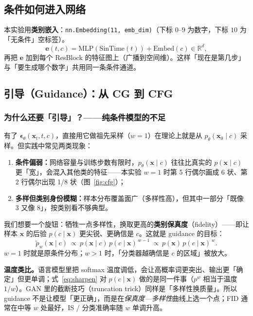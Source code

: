 \documentclass[a4paper,fontset=none,zihao=5]{ctexart}
\newcommand{\x}{\mathbf{x}}
\newcommand{\epst}{\boldsymbol{\epsilon}_\theta}
\newcommand{\code}[1]{\texttt{#1}}
\begin{document}
\subsection{条件如何进入网络}
本实验用\textbf{类别嵌入}：\code{nn.Embedding(11, emb\_dim)}（下标 $0$–$9$ 为数字，下标 $10$ 为「无条件」空标签）。
\begin{equation}
  \mathbf e(t,c)=\mathrm{MLP}(\mathrm{SinTime}(t))+\mathrm{Embed}(c)\in\mathbb R^{d},
\end{equation}
再把 $\mathbf e$ 加到每个 ResBlock 的特征图上（广播到空间维）。这样「现在是第几步」与「要生成哪个数字」共用同一条条件通道。

\subsection{引导（Guidance）：从 CG 到 CFG}

\subsubsection{为什么还要「引导」？——纯条件模型的不足}
有了 $\epst(\x_t,t,c)$，直接用它做祖先采样（$w=1$）在理论上就是从 $p_\theta(\x_0\mid c)$ 采样。但实践中常见两类现象：
\begin{enumerate}[leftmargin=2em,itemsep=1pt]
  \item \textbf{条件偏弱：}网络容量与训练步数有限时，$p_\theta(\x\mid c)$ 往往比真实的 $p(\x\mid c)$ 更「宽」，会混入其他类的特征——本实验 $w=1$ 时第 5 行偶尔画成 6 状、第 2 行偶尔出现 1/8 状（图~\ref{fig:cfg}）；
  \item \textbf{多样但类别身份模糊：}样本分布覆盖面广（多样性高），但其中一部分「既像 3 又像 8」，按类别看不够典型。
\end{enumerate}
我们想要一个旋钮：牺牲一点多样性，换取更高的\textbf{类别保真度}（fidelity）——即让样本 $\x$ 的后验 $p(c\mid\x)$ 更尖锐、更确信是 $c$。这就是 guidance 的目标：
\begin{equation}
  \tilde p_w(\x\mid c)\ \propto\ p(\x\mid c)\,p(c\mid\x)^{\,w-1}
  \ \propto\ p(\x)\,p(c\mid\x)^{\,w}.
  \label{eq:sharpen}
\end{equation}
$w=1$ 时就是原条件分布；$w>1$ 时，「分类器越确信是 $c$ 的区域」被放大。

\begin{whybox}
\textbf{温度类比。}语言模型里把 softmax 温度调低，会让高概率词更突出、输出更「确定」但更单调；式~\eqref{eq:sharpen} 对 $p(c\mid\x)$ 做的是同一件事（$p^{w}$ 相当于温度 $1/w$）。GAN 里的截断技巧（truncation trick）同样是「多样性换质量」。所以 guidance 不是让模型「更正确」，而是在\emph{保真度—多样性}曲线上选一个点；FID 通常在中等 $w$ 处最好，IS / 分类准确率随 $w$ 单调升高。
\end{whybox}
\end{document}
